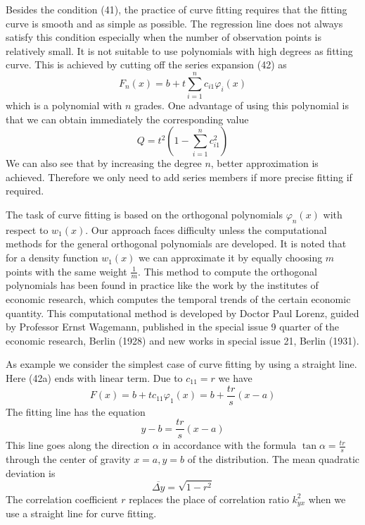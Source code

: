 \documentclass{article}
\begin{document}
Besides the condition (41), the practice of curve fitting
requires that the fitting curve is smooth and as simple as possible.
The regression line does not always satisfy this condition especially
when the number of observation points is relatively small.
It is not suitable to use polynomials with high degrees as fitting curve.
This is achieved by cutting off the series expansion (42) as
\begin{equation}
F_n(x) = b + t \sum_{i=1}^{n} c_{i1} \varphi_i(x) \tag{42a}
\end{equation}
which is a polynomial with $n$ grades. One advantage of using this polynomial is that we can obtain immediately the corresponding value
\begin{equation}
    Q = t^2(1-\sum_{i=1}^n c_{i1}^2) \tag{43a}
\end{equation}
We can also see that by increasing the degree $n$, better approximation
is achieved.
Therefore we only need to add series members if more
precise fitting if required.

The task of curve fitting is based on the orthogonal polynomials $\varphi_n(x)$
with respect to $w_1(x)$. Our approach faces difficulty
unless the computational methods for the general orthogonal
polynomials are developed. It is noted that for a density
function $w_1(x)$ we can approximate it by equally choosing $m$ points
with the same weight $\frac{1}{m}$. This method to compute
the orthogonal polynomials has been found in practice like the work by the institutes of economic research, which computes
the temporal trends of the certain economic quantity.
This computational
method is developed by Doctor Paul Lorenz, guided by Professor Ernst Wagemann, published in the special issue 9 quarter of the economic research, Berlin
(1928) and new works in special issue 21, Berlin (1931).

As example we consider the simplest case of curve fitting by using a straight line. Here (42a) ends with linear term. Due to $c_{11}=r$
we have
$$
F(x)=b+t c_{11} \varphi_{1}(x)=b+\frac{t r}{s}(x-a)
$$
The fitting line has the equation
$$
y-b=\frac{t r}{s}(x-a)
$$
This line goes along the direction $\alpha$
in accordance with the formula $\tan \alpha = \frac{tr}{s}$ through
the center of gravity $x=a, y=b$ of the distribution. The mean
quadratic deviation is
$$
\overline{\Delta y}=\sqrt{1-r^{2}}
$$
The correlation coefficient $r$ replaces the place of correlation ratio $k^2_{yx}$ when we use a straight line for curve fitting.
\end{document}
